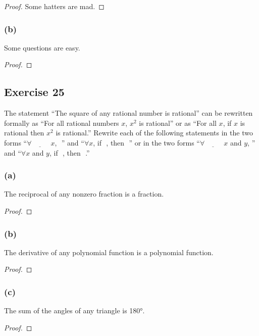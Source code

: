 \documentclass[14pt]{extarticle}
\newcommand{\fbl}{\underline{\hspace{1cm}}\,\,}
\newcommand{\fa}{\forall}
\begin{document}
\begin{proof}
Some hatters are mad.

\end{proof}

\subsubsection{(b)}
Some questions are easy.

\begin{proof}

\end{proof}

\subsection{Exercise 25}
The statement “The square of any rational number is rational” can be rewritten formally as “For all rational numbers $x$, $x^2$ is rational” or as “For all $x$, if $x$ is rational then $x^2$ is rational.” Rewrite each of the following statements in the two forms “$\fa \fbl x$, \fbl” and “$\fa x$, if \fbl, then \fbl” or in the two forms “$\fa \fbl x$ and $y$, ”\fbl and “$\fa x$ and $y$, if \fbl, then \fbl.”

\subsubsection{(a)}
The reciprocal of any nonzero fraction is a fraction.

\begin{proof}

\end{proof}

\subsubsection{(b)}
The derivative of any polynomial function is a polynomial function.
\begin{proof}

\end{proof}

\subsubsection{(c)}
The sum of the angles of any triangle is 180°.

\begin{proof}

\end{proof}
\end{document}

